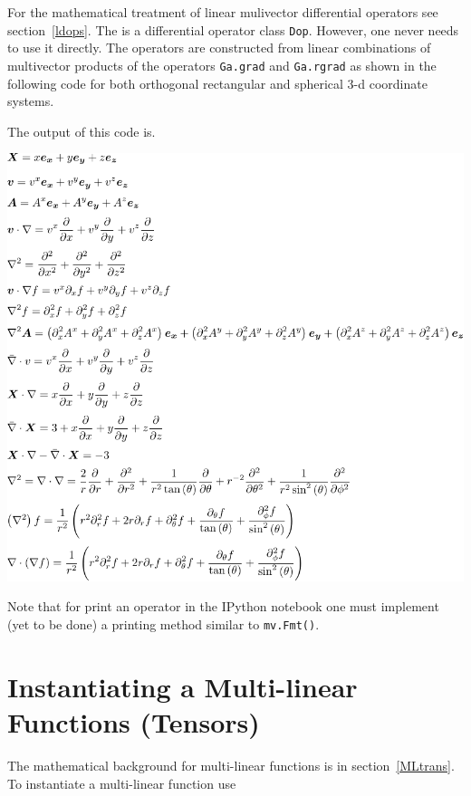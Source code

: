 \documentclass[12pt]{report}
\newcommand{\T}[1]{\texttt{#1}}
\newcommand{\includecode}[1]{}
\begin{document}
For the mathematical treatment of linear mulivector differential operators see section~\ref{ldops}.  The is a differential operator
class \T{Dop}. However, one never needs to use it directly.  The operators are constructed from linear combinations of multivector 
products of the operators \T{Ga.grad} and \T{Ga.rgrad} as shown in the following code for both orthogonal rectangular and spherical
3-d coordinate systems. 
\includecode{python/Dop.py}
The output of this code is.
\begin{center}
	\includegraphics[scale=1]{python/Dop.pdf}
\end{center}

Note that for print an operator in the IPython notebook one must implement (yet to be done) a printing method similar to \T{mv.Fmt()}.

\section{Instantiating a Multi-linear Functions (Tensors)}

The mathematical background for multi-linear functions is in section~\ref{MLtrans}.  To instantiate a multi-linear function use
\end{document}
